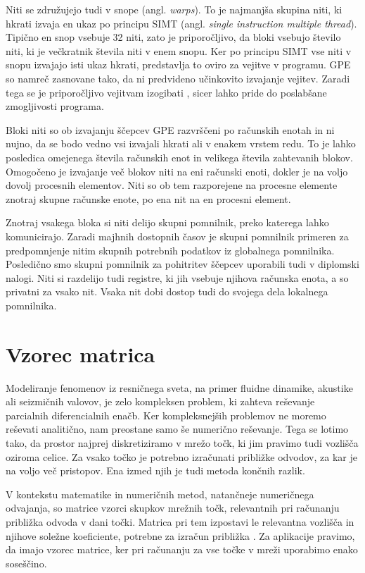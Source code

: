 \documentclass[a4paper, 12pt, openright]{book}
\begin{document}
Niti se združujejo tudi v snope (angl. \textit{warps}). To je najmanjša skupina niti, ki hkrati izvaja en ukaz po principu SIMT (angl. \textit{single instruction multiple thread}).
Tipično en snop vsebuje 32 niti, zato je priporočljivo, da bloki vsebujo število niti, ki je večkratnik števila niti v enem snopu.
Ker po principu SIMT vse niti v snopu izvajajo isti ukaz hkrati, predstavlja to oviro za vejitve v programu.
GPE so namreč zasnovane tako, da ni predvideno učinkovito izvajanje vejitev.
Zaradi tega se je priporočljivo vejitvam izogibati \cite{cuda-programming-guide}, sicer lahko pride do poslabšane zmogljivosti programa.

Bloki niti so ob izvajanju ščepcev GPE razvrščeni po računskih enotah in ni nujno, da se bodo vedno vsi izvajali hkrati ali v enakem vrstem redu. To je lahko posledica omejenega števila računskih enot in velikega števila zahtevanih blokov.
Omogočeno je izvajanje več blokov niti na eni računski enoti, dokler je na voljo dovolj procesnih elementov.
Niti so ob tem razporejene na procesne elemente znotraj skupne računske enote, po ena nit na en procesni element.

Znotraj vsakega bloka si niti delijo skupni pomnilnik, preko katerega lahko komunicirajo.
Zaradi majhnih dostopnih časov je skupni pomnilnik primeren za predpomnjenje nitim skupnih potrebnih podatkov iz globalnega pomnilnika.
Posledično smo skupni pomnilnik za pohitritev ščepcev uporabili tudi v diplomski nalogi.
Niti si razdelijo tudi registre, ki jih vsebuje njihova računska enota, a so privatni za vsako nit. Vsaka nit dobi dostop tudi do svojega dela lokalnega pomnilnika.

\section{Vzorec matrica}
\label{stencil}

Modeliranje fenomenov iz resničnega sveta, na primer fluidne dinamike, akustike ali seizmičnih valovov, je zelo kompleksen problem, ki zahteva reševanje parcialnih diferencialnih enačb.
Ker kompleksnejših problemov ne moremo reševati analitično, nam preostane samo še numerično reševanje.
Tega se lotimo tako, da prostor najprej diskretiziramo v mrežo točk, ki jim pravimo tudi vozlišča oziroma celice.
Za vsako točko je potrebno izračunati približke odvodov, za kar je na voljo več pristopov.
Ena izmed njih je tudi metoda končnih razlik.

V kontekstu matematike in numeričnih metod, natančneje numeričnega odvajanja, so matrice vzorci skupkov mrežnih točk, relevantnih pri računanju približka odvoda v dani točki. Matrica pri tem izpostavi le relevantna vozlišča in njihove soležne koeficiente, potrebne za izračun približka \cite{enwiki:1339867648, enwiki:1301222257}.
Za aplikacije pravimo, da imajo vzorec matrice, ker pri računanju za vse točke v mreži uporabimo enako soseščino.
\end{document}
